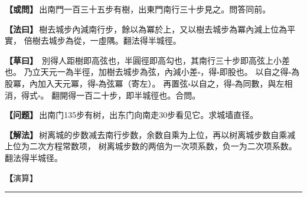 \documentclass[11pt,a4paper]{article}
\let\origsquare\square
\renewcommand{\square}{\ensuremath{\origsquare}}%
\newcommand{\longline}{\noindent\rule{\textwidth}{0.4pt}}
\newcommand{\clOWEN}[1]{%
  \par\vspace{0.3em}%
  \noindent\textcolor{problemcolor}{\textbf{【或問】}}\,{\tradfont #1}\par\nopagebreak%
}
\newcommand{\mdOWEN}[1]{%
  \par\vspace{0.3em}%
  \noindent\textcolor{problemcolor}{\textbf{【问题】}}\,{\modfont #1}\par\nopagebreak%
}
\newcommand{\clFAYUE}[1]{%
  \par\noindent\textcolor{methodcolor}{\textbf{【法曰】}}\,{\tradfont #1}\par\nopagebreak%
}
\newcommand{\mdFAYUE}[1]{%
  \par\noindent\textcolor{methodcolor}{\textbf{【解法】}}\,{\modfont #1}\par\nopagebreak%
}
\newcommand{\clTSAOYUE}[1]{%
  \par\noindent\textcolor{workcolor}{\textbf{【草曰】}}\,{\tradfont #1}\par%
}
\newcommand{\mdTSAOYUE}[1]{%
  \par\noindent\textcolor{workcolor}{\textbf【演算】}}\,{\modfont #1}\par%
\begin{document}
\begin{paracol}{2}

\begin{leftcolumn}
\clOWEN{出南門一百三十五步有樹，出東門南行三十步見之。問答同前。}

\clFAYUE{樹去城步內減南行步，餘以為冪於上，又以樹去城步為冪內減上位為平實，
倍樹去城步為從，一虛隅。翻法得半城徑。}

\clTSAOYUE{%
別得人距樹即高弦也，半圓徑即高勾也，其南行三十步即高弦上小差也。
乃立天元一為半徑，加樹去城步為弦，內減小差$\square$，得$\square$即股也。
以自之得$\square$為股冪，內加入天元冪，得$\square$為弦冪（寄左）。
再置弦$\square$以自之，得$\square$為同數，與左相消，得式$\square$。
翻開得一百二十步，即半城徑也。合問。}
\end{leftcolumn}

\switchcolumn

\begin{rightcolumn}
\mdOWEN{出南门135步有树，出东门向南走30步看见它。求城墙直径。}

\mdFAYUE{树离城的步数减去南行步数，余数自乘为上位，再以树离城步数自乘减上位为二次方程常数项，
树离城步数的两倍为一次项系数，负一为二次项系数。翻法得半城径。}

\mdTSAOYUE{%
辨识得：人到树的距离即为高弦，半圆径即为高勾，南行30步为高弦上的小差。
设天元一为半径，加上树离城步数为弦，减去小差$\square$，得$\square$即股。
自乘得$\square$为股冪，加上天元冪，得$\square$为弦冪（寄左）。
再置弦$\square$自乘，得$\square$为同数，与左式相消得式$\square$。
翻法开方得120步，即半城径。符合所问。}
\end{rightcolumn}

\end{paracol}

\vspace{0.3cm}
\begin{center}\longline\end{center}
\end{document}
